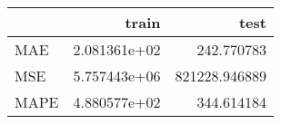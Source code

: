 \begin{tabular}{lrr}
\toprule
{} &         train &           test \\
\midrule
MAE  &  2.081361e+02 &     242.770783 \\
MSE  &  5.757443e+06 &  821228.946889 \\
MAPE &  4.880577e+02 &     344.614184 \\
\bottomrule
\end{tabular}
